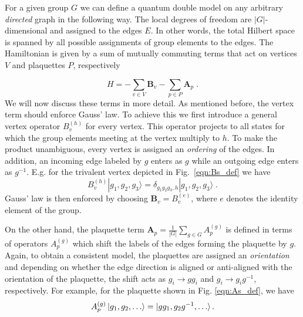 \documentclass[two column]{article}
\begin{document}
For a given group $G$ we can define a quantum double model on any arbitrary \emph{directed} graph in the following way. The local degrees of freedom are $|G|$-dimensional and assigned to the edges $E$. In other words, the total Hilbert space is spanned by all possible assignments of group elements to the edges. The Hamiltonian is given by  a sum of mutually commuting terms that act on vertices $V$ and plaquettes $P$, respectively




\begin{equation}
    H = -  \sum_{v \in V} \mathbf B_v -  \sum_{p  \in  P} \mathbf A_p \label{eqn:ham} \;.
\end{equation}
We will now discuss these terms in more detail. As mentioned before, the vertex term should enforce Gauss' law. To achieve this we first introduce a general vertex operator $B_v^{(h)}$ for every vertex. This operator projects to all states for which the group elements meeting at the vertex multiply to $h$. To make the product unambiguous, every vertex is assigned an \emph{ordering} of the edges. In addition, an incoming edge labeled by $g$ enters as $g$ while an outgoing edge enters as $g^{-1}$. E.g. for the trivalent vertex depicted in Fig.~\ref{eqn:Bs_def} we have 
\begin{equation}
B_v^{(h)} |g_1,g_2,g_3\rangle= \delta_{g_1 g_2 g_3,h} |g_1,g_2,g_3\rangle \;.	
\end{equation}
Gauss' law is then enforced by choosing $\mathbf B_v=B^{(e)}_v$, where $e$ denotes the identity element of the group.

On the other hand, the plaquette term 
	$\mathbf A_p=\frac{1}{|G|} \sum_{g \in G} A^{(g)}_p$
is defined in terms of operators $A^{(g)}_p$ which shift the labels of the edges forming the plaquette by $g$. Again, to obtain a consistent model, the plaquettes are assigned an \emph{orientation} and depending on whether the edge direction is aligned or anti-aligned with the orientation of the plaquette, the shift acts as $g_i \rightarrow gg_i$ and $g_i \rightarrow g_ig^{-1}$, respectively. For example, for the plaquette shown in Fig. \ref{eqn:As_def}, we have 
\begin{equation}
	A_p^{(g)}\ket{g_1, g_2, \ldots} = \ket{gg_1, g_2g^{-1}, \ldots}.
\end{equation} 
\end{document}
